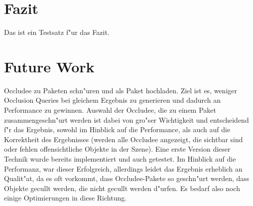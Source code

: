 \documentclass[journal]{vgtc}
\begin{document}
%
%
%
%

\section{Fazit}
Das ist ein Testsatz f"ur das Fazit.

\section{Future Work}
Occludee zu Paketen schn"uren und als Paket hochladen. Ziel ist es, weniger Occlusion Queries bei gleichem Ergebnis zu generieren und dadurch an Performance zu gewinnen.
Auswahl der Occludee, die zu einem Paket zusammengeschn"urt werden ist dabei von gro"ser Wichtigkeit und entscheidend f"r das Ergebnis, sowohl im Hinblick auf die Performance, als auch auf die Korrektheit des Ergebnisses (werden alle Occludee angezeigt, die sichtbar sind oder fehlen offensichtliche Objekte in der Szene).
Eine erste Version dieser Technik wurde bereits implementiert und auch getestet. Im Hinblick auf die Performanz, war dieser Erfolgreich, allerdings leidet das Ergebnis erheblich an Qualit"at, da es oft vorkommt, dass Occludee-Pakete so geschn"urt werden, dass Objekte gecullt werden, die nicht gecullt werden d"urfen. Es bedarf also noch einige Optimierungen in diese Richtung.

 

\end{document}
